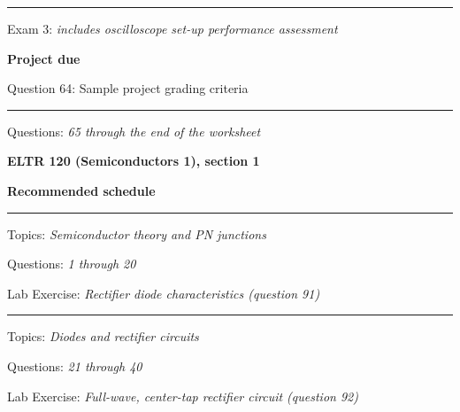 
\vskip 10pt
\hrule \vskip 5pt
\noindent
{}

\hskip 10pt Exam 3: {\it includes oscilloscope set-up performance assessment}

\hskip 10pt {\bf Project due}

\hskip 10pt Question 64: Sample project grading criteria
 
\vskip 10pt
\hrule \vskip 5pt
\noindent
{}

\hskip 10pt Questions: {\it 65 through the end of the worksheet}
 





\vfil \eject

\centerline{\bf ELTR 120 (Semiconductors 1), section 1} \bigskip 
 
\vskip 10pt

\noindent
{\bf Recommended schedule}

\vskip 5pt

\hrule \vskip 5pt
\noindent
{}

\hskip 10pt Topics: {\it Semiconductor theory and PN junctions}
 
\hskip 10pt Questions: {\it 1 through 20}
 
\hskip 10pt Lab Exercise: {\it Rectifier diode characteristics (question 91)}
 




\vskip 10pt
\hrule \vskip 5pt
\noindent
{}

\hskip 10pt Topics: {\it Diodes and rectifier circuits}
 
\hskip 10pt Questions: {\it 21 through 40}
 
\hskip 10pt Lab Exercise: {\it Full-wave, center-tap rectifier circuit (question 92)}
 
